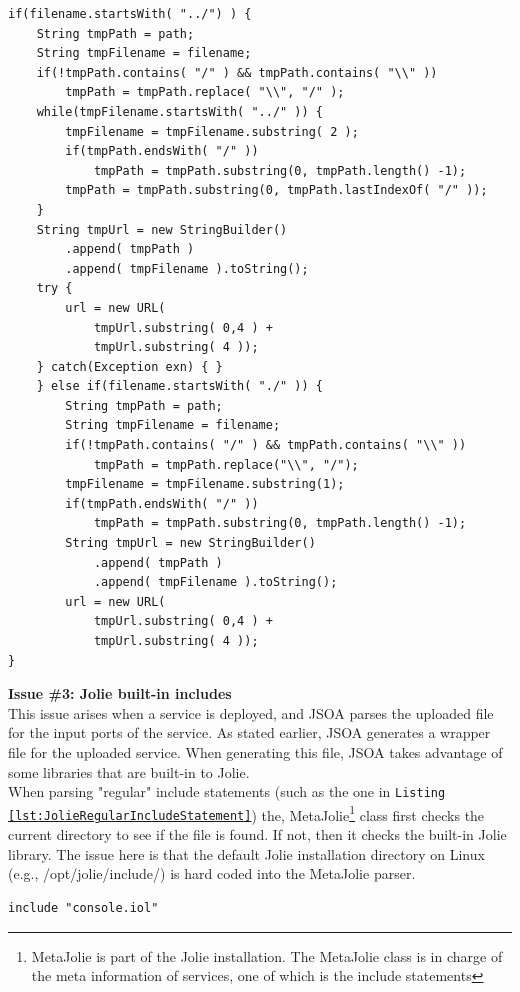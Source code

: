 \documentclass[12pt,a4paper]{article}
\begin{document}
\begin{lstlisting}[caption={Fix for jap file include paths},label={lst:japIncludeIssue}]
if(filename.startsWith( "../") ) {
	String tmpPath = path;
	String tmpFilename = filename;
	if(!tmpPath.contains( "/" ) && tmpPath.contains( "\\" )) 
		tmpPath = tmpPath.replace( "\\", "/" );
	while(tmpFilename.startsWith( "../" )) {
		tmpFilename = tmpFilename.substring( 2 );
		if(tmpPath.endsWith( "/" )) 
			tmpPath = tmpPath.substring(0, tmpPath.length() -1);
		tmpPath = tmpPath.substring(0, tmpPath.lastIndexOf( "/" ));
	}
	String tmpUrl = new StringBuilder()
		.append( tmpPath )
		.append( tmpFilename ).toString();
	try {
		url = new URL(
			tmpUrl.substring( 0,4 ) + 
			tmpUrl.substring( 4 ));
	} catch(Exception exn) { }
	} else if(filename.startsWith( "./" )) {
		String tmpPath = path;
		String tmpFilename = filename;
		if(!tmpPath.contains( "/" ) && tmpPath.contains( "\\" )) 
			tmpPath = tmpPath.replace("\\", "/");
		tmpFilename = tmpFilename.substring(1);
		if(tmpPath.endsWith( "/" )) 
			tmpPath = tmpPath.substring(0, tmpPath.length() -1);
		String tmpUrl = new StringBuilder()
			.append( tmpPath )
			.append( tmpFilename ).toString();
		url = new URL(
			tmpUrl.substring( 0,4 ) + 
			tmpUrl.substring( 4 ));
}
\end{lstlisting}

\textbf{Issue \#3: Jolie built-in includes} \\
This issue arises when a service is deployed, and JSOA parses the uploaded file for the input ports of the service. As stated earlier, JSOA generates a wrapper file for the uploaded service. When generating this file, JSOA takes advantage of some libraries that are built-in to Jolie.\\
When parsing "regular" include statements (such as the one in \texttt{Listing \ref{lst:JolieRegularIncludeStatement}}) the, MetaJolie\footnote{MetaJolie is part of the Jolie installation. The MetaJolie class is in charge of the meta information of services, one of which is the include statements} class first checks the current directory to see if the file is found. If not, then it checks the built-in Jolie library. The issue here is that the default Jolie installation directory on Linux (e.g., /opt/jolie/include/) is hard coded into the MetaJolie parser.

\begin{lstlisting}[caption={Jolie regular include statement},label={lst:JolieRegularIncludeStatement}]
include "console.iol"
\end{lstlisting}
\end{document}

